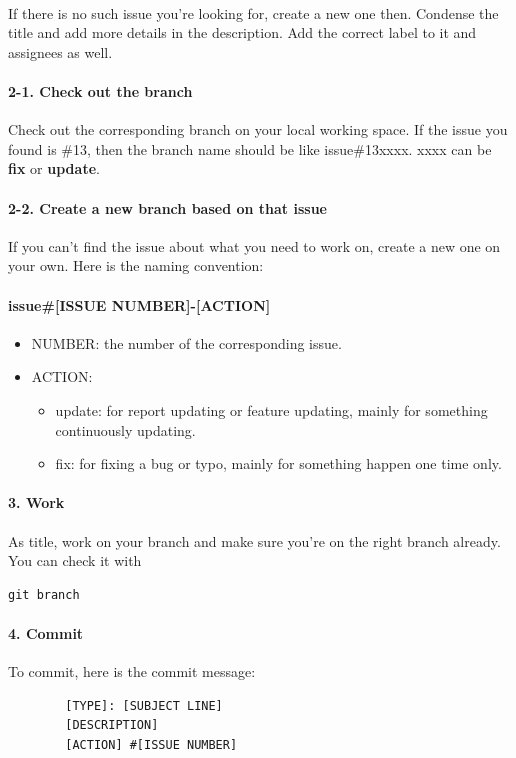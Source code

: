 \documentclass[12pt,a4paper]{article}
\begin{document}
\begin{appendices}
      \paragraph{}
      If there is no such issue you're looking for, create a new one then. Condense the title and add more details in the description. Add the correct label to it and assignees as well.

      \paragraph{2-1. Check out the branch}
      Check out the corresponding branch on your local working space. If the issue you found is \#13, then the branch name should be like issue\-\#13\-xxxx. xxxx can be {\bf fix} or {\bf update}.
      \paragraph{2-2. Create a new branch based on that issue}
      If you can't find the issue about what you need to work on, create a new one on your own. Here is the naming convention:
      \paragraph{issue\-\#[ISSUE NUMBER]-[ACTION]}
      \begin{itemize}
        \item NUMBER: the number of the corresponding issue.
        \item ACTION:
        \begin{itemize}
          \item update: for report updating or feature updating, mainly for something continuously updating.
          \item fix: for fixing a bug or typo, mainly for something happen one time only.
        \end{itemize}
      \end{itemize}
      \paragraph{3. Work}
      As title, work on your branch and make sure you're on the right branch already. You can check it with \begin{verbatim}git branch\end{verbatim}
      \paragraph{4. Commit}
      To commit, here is the commit message:
      \begin{verbatim}
        [TYPE]: [SUBJECT LINE]
        [DESCRIPTION]
        [ACTION] #[ISSUE NUMBER]
      \end{verbatim}
    

\end{appendices}
\end{document}
